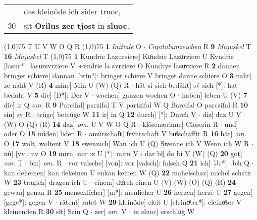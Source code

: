 \documentclass[8pt,a4paper,notitlepage]{article}
\begin{document}
\begin{table}[ht]
\begin{minipage}[t]{0.5\linewidth}
\begin{tabular}{rl}
 & des kleinôde ich sider truoc,\\ 
30 & sît \textbf{Orilus zer tjost} in \textbf{sluoc}.\\ 
\end{tabular}
\scriptsize
\line(1,0){75} \newline
T U V W O Q R \newline
\line(1,0){75} \newline
\textbf{1} \textit{Initiale} O   $\cdot$ \textit{Capitulumzeichen} R  \textbf{9} \textit{Majuskel} T  \textbf{16} \textit{Majuskel} T  \newline
\line(1,0){75} \newline
\textbf{1} Kundrie Lazursiere] Kuͦndrie Lazuͦrziere U Kvndrie [lasur*]: lasursvrziere V ÷vndrie la svrziere O Kundrye lasuͯrziere R \textbf{2} dannen bringet schiere] dannan [brin*]: bringet schiere V bringet danne schiere O \textbf{3} naht] ze naht V (R) \textbf{4} mîne] Min U (W) (Q) R  $\cdot$ hât si sich bedâht] sv́ sich [*]: hat bedaht V \textbf{5} die] [D*]: Der V  $\cdot$ wochen] ganzen wochen O  $\cdot$ haben] leben U (V) \textbf{7} die] ir Q \textit{om.} R \textbf{9} Parcifal] parzifal T V partzifal W Q Barcifal O parczifal R \textbf{10} sin] sy R  $\cdot$ trüge] betrúge W \textbf{11} ir] in Q \textbf{12} durch] [*]: Durch V  $\cdot$ diz] daz U V (W) O (Q) (R) \textbf{14} daz] \textit{om.} U V W O Q R  $\cdot$ klôsenærinne] Closerin R  $\cdot$ und] oder O \textbf{15} mîden] liden R  $\cdot$ amûrschaft] frv́ntschaft V buͯlschafftt R \textbf{16} hât] \textit{om.} O \textbf{17} wolt] woltent V \textbf{18} swennich] Wan ich U (Q) Swenne ich V Wenn ich W R  $\cdot$ nû] [vv]: nv O \textbf{19} mirn] mir iz U [*]: mirn V  $\cdot$ dar bî] do bi V (W) (Q) \textbf{20} got] \textit{om.} T  $\cdot$ bin] \textit{om.} R  $\cdot$ vor valsche] [von]: vor [valsch]: falsch Q \textbf{21} ich] [Jc*]: Jch Q  $\cdot$ kan deheinen] kan dekeinen U enkan keinen W (Q) \textbf{22} mahelschaz] michel schatz W \textbf{23} tragich] dragen ich U  $\cdot$ einem] duͦrch einen U (V) (W) (O) (Q) (R) \textbf{24} gewan] genan R \textbf{25} menschlîcher] [m*]: menlicher U \textbf{26} herzen] herze U \textbf{27} gegen] [gege*]: gegen V  $\cdot$ râtent] ratet W \textbf{29} kleinôde] cleit U [cleinoͤter*]: cleinoͤter V kleinenden R \textbf{30} sît] Sein Q  $\cdot$ zer] \textit{om.} V  $\cdot$ in sluoc] erschluͦg W \newline
\end{minipage}
\end{table}
\end{document}
